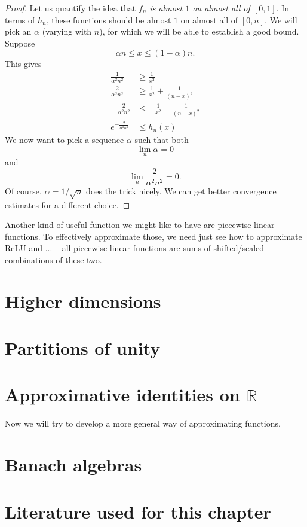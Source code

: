 \begin{proof}
Let us quantify the idea that \emph{\( f_n \) is almost \( 1 \) on almost all of \( [0,1] \)}. In terms of \( h_n \), these functions should be almost \( 1 \) on almost all of \( [0,n] \). We will pick an \( \alpha \) (varying with \( n \)), for which we will be able to establish a good bound.
Suppose
\[ 
    \alpha n \leq x \leq (1 - \alpha) n.
\]
This gives
\begin{align*}
    \frac{1}{\alpha^2n^2} &\geq \frac{1}{x^2}  \\
    \frac{2}{\alpha^2n^2} &\geq \frac{1}{x^2} + \frac{1}{(n-x)^2} \\
    -\frac{2}{\alpha^2n^2} &\leq -\frac{1}{x^2} - \frac{1}{(n-x)^2} \\
    e^{-\frac{2}{\alpha^2n^2}} &\leq  h_n(x)
\end{align*}
We now want to pick a sequence \( \alpha \) such that both
\[ 
    \lim\limits_n \alpha = 0
\]
and
\[ 
    \lim\limits_n \frac{2}{\alpha^2n^2} = 0.
\]
Of course, \( \alpha = 1/\sqrt{n} \) does the trick nicely. We can get better convergence estimates for a different choice.
\end{proof}

Another kind of useful function we might like to have are piecewise linear functions. To effectively approximate those, we need just see how to approximate ReLU and ... -- all piecewise linear functions are sums of shifted/scaled combinations of these two.

\section{Higher dimensions}

\section{Partitions of unity}


\section{Approximative identities on \(\mathbb{R}\)}
Now we will try to develop a more general way of approximating functions.

\section{Banach algebras}

\section{Literature used for this chapter}
